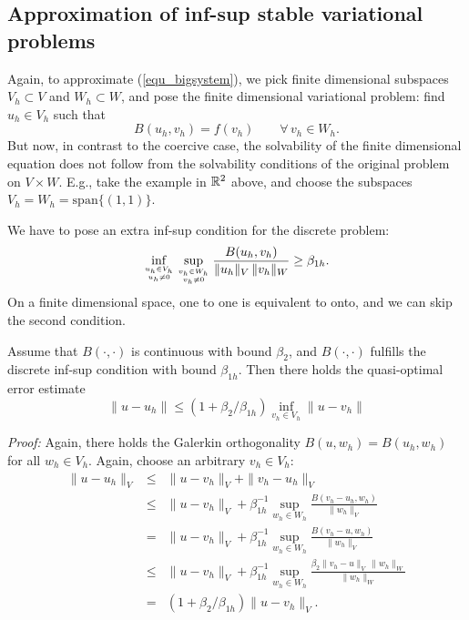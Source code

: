 \bigskip

\subsection{Approximation of inf-sup stable variational problems}
Again, to approximate (\ref{equ_bigsystem}), we pick finite dimensional
subspaces $V_h \subset V$ and $W_h \subset W$, and pose the finite dimensional
variational problem: find $u_h \in V_h$ such that
$$
B(u_h, v_h) = f(v_h) \qquad \forall \, v_h \in W_h.
$$
But now, in contrast to the coercive case, the solvability of the 
finite dimensional equation does not follow from the solvability conditions
of the original problem on $V \times W$. E.g., take the example in ${\mathbb R}^2$
above, and choose the subspaces $V_h = W_h = \mbox{span} \{ (1,1) \}$. 

We have to pose an extra inf-sup condition for the discrete problem:
\begin{equation} \label{equ_infsuph}
\inf_{u_h \in V_h \atop u_h \neq 0} \sup_{v_h \in W_h \atop v_h \neq 0}
\frac{ B(u_h,v_h) } { \| u_h \|_V \, \| v_h \|_W } \geq \beta_{1h}.
\end{equation}
On a finite dimensional space, one to one is equivalent to onto, and we
can skip the second condition.

\begin{theorem} \label{theo_approxinfsup}
Assume that $B(\cdot,\cdot)$ is continuous with bound $\beta_2$, and 
$B(\cdot,\cdot)$ fulfills the discrete inf-sup condition with bound $\beta_{1h}$. 
Then there holds the quasi-optimal error estimate
\begin{equation}
\| u - u_h \| \leq (1 + \beta_2 / \beta_{1h}) \inf_{v_h \in V_h} \| u - v_h \|
\end{equation}
\end{theorem}
\noindent
{\em Proof:} Again, there holds the Galerkin orthogonality $B(u,w_h) = B(u_h,w_h)$ for all $w_h \in V_h$. Again, choose an arbitrary $v_h \in V_h$:
\begin{eqnarray*}
\| u - u_h \|_V & \leq & \| u - v_h \|_V + \| v_h - u_h \|_V \\
        & \leq & \| u - v_h \|_V + \beta_{1h}^{-1} 
                \sup_{w_h \in W_h} \frac{ B(v_h-u_h, w_h) } { \| w_h \|_V } \\
        & = &  \| u - v_h \|_V + \beta_{1h}^{-1} 
                \sup_{w_h \in W_h} \frac{ B(v_h-u, w_h) } { \| w_h \|_V } \\
        & \leq & \| u - v_h \|_V + \beta_{1h}^{-1}
                \sup_{w_h \in W_h} \frac{ \beta_2 \| v_h-u \|_V \, \| w_h \|_W } { \| w_h \|_W } \\
        & = & (1 + \beta_2 / \beta_{1h}) \| u - v_h\|_V.
\end{eqnarray*}
